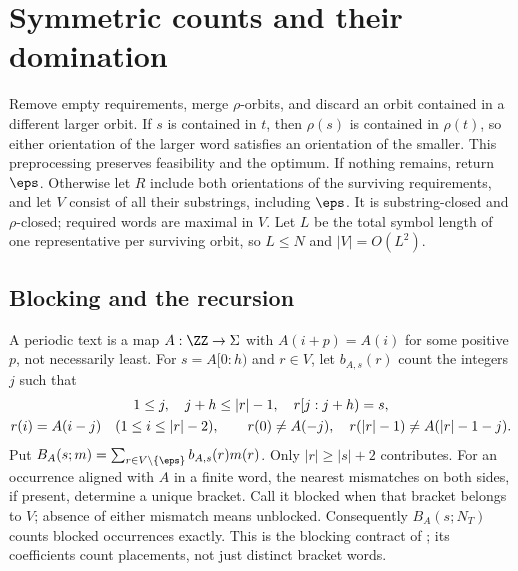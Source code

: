 \section{Symmetric counts and their domination}\label{sec:counts}
Remove empty requirements, merge $\rho$-orbits, and discard an orbit
contained in a different larger orbit. If $s$ is contained in $t$, then
$\rho(s)$ is contained in $\rho(t)$, so either orientation of the larger
word satisfies an orientation of the smaller. This preprocessing preserves
feasibility and the optimum. If nothing remains, return $\eps$.
Otherwise let $R$ include both orientations of the surviving requirements,
and let $V$ consist of all their substrings, including $\eps$.
It is substring-closed and $\rho$-closed; required words are maximal in $V$.
Let $L$ be the total symbol length of one representative per surviving
orbit, so $L\le N$ and $|V|=O(L^2)$.

\subsection{Blocking and the recursion}\label{sec:blocking}
A periodic text is a map $A:\ZZ\to\Sigma$ with $A(i+p)=A(i)$ for
some positive $p$, not necessarily least. For $s=A[0:h)$ and $r\in V$,
let $b_{A,s}(r)$ count the integers $j$ such that
\begin{gather}
1\le j,\quad j+h\le |r|-1,\quad r[j:j+h)=s,\notag\\
r(i)=A(i-j)\quad(1\le i\le|r|-2),\qquad
r(0)\ne A(-j),\quad r(|r|-1)\ne A(|r|-1-j).\label{eq:block}
\end{gather}
Put $B_A(s;m)=\sum_{r\in V\setminus\{\eps\}}b_{A,s}(r)m(r)$.
Only $|r|\ge |s|+2$ contributes. For an occurrence aligned with $A$
in a finite word, the nearest mismatches on both sides, if present,
determine a unique bracket. Call it blocked when that bracket belongs
to $V$; absence of either mismatch means unblocked. Consequently
$B_A(s;N_T)$ counts blocked occurrences exactly. This is the blocking
contract of ; its coefficients count placements,
not just distinct bracket words.

